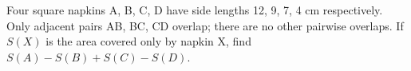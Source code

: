 Four square napkins A, B, C, D have side lengths 12, 9, 7, 4 cm respectively. Only adjacent pairs AB, BC, CD overlap; there are no other pairwise overlaps. If $S(X)$ is the area covered only by napkin X, find $S(A)-S(B)+S(C)-S(D)$.
